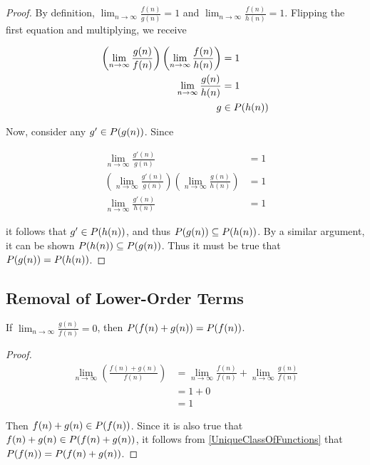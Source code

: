 \begin{proof}
	By definition, $\lim_{n \to \infty} \frac{f(n)}{g(n)} = 1$ and $\lim_{n \to \infty} \frac{f(n)}{h(n)} = 1$. Flipping the first equation and multiplying, we receive
	
	\begin{align*}
	\left( \lim_{n \to \infty} \frac {g(n)} {f(n)} \right) \left( \lim_{n \to \infty} \frac {f(n)} {h(n)} \right) &= 1\\
	\lim_{n \to \infty} \frac {g(n)} {h(n)} &= 1\\
	g &\in P(h(n))
	\end{align*}
	
	Now, consider any $g' \in P(g(n))$. Since
	
	\begin{align*}
	\lim_{n \to \infty} \frac {g'(n)} {g(n)} &= 1\\
	\left( \lim_{n \to \infty} \frac {g'(n)} {g(n)} \right) \left( \lim_{n \to \infty} \frac{g(n)}{h(n)} \right) &= 1\\
	\lim_{n \to \infty} \frac{g'(n)}{h(n)} &= 1
	\end{align*}
	
	it follows that $g' \in P(h(n))$, and thus $P(g(n)) \subseteq P(h(n))$. By a similar argument, it can be shown $P(h(n)) \subseteq P(g(n))$. Thus it must be true that $P(g(n)) = P(h(n))$.
\end{proof}

\subsection{Removal of Lower-Order Terms}
\label{ScrubsLowerOrderTerms}

\begin{theorem}
	If $\lim_{n \to \infty} \frac{g(n)}{f(n)} = 0$, then $P(f(n) + g(n)) = P(f(n))$.
\end{theorem}

\begin{proof}
	\begin{align*}
	\lim_{n \to \infty} \left( \frac{f(n) + g(n)}{f(n)} \right) &= \lim_{n \to \infty} \frac{f(n)}{f(n)} + \lim_{n \to \infty} \frac{g(n)}{f(n)}\\
	&= 1 + 0\\
	&= 1
	\end{align*}
	
	Then $f(n) + g(n) \in P(f(n))$. Since it is also true that $f(n) + g(n) \in P(f(n) + g(n))$, it follows from \ref{UniqueClassOfFunctions} that $P(f(n)) = P(f(n) + g(n))$.
\end{proof}